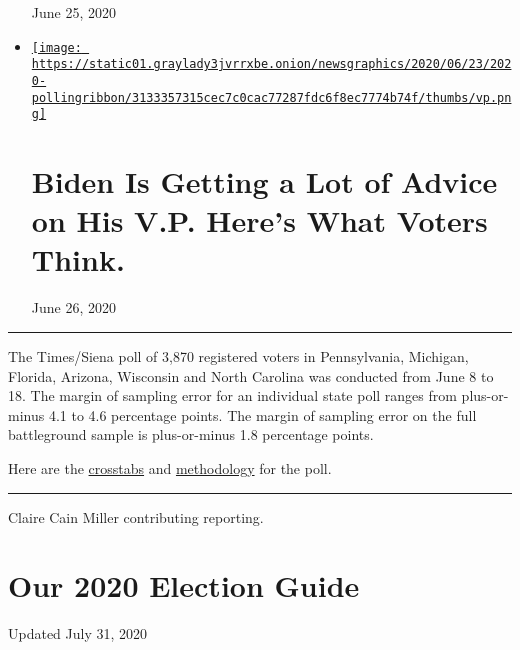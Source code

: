 \begin{itemize}
  June 25, 2020
\item
  \href{https://www.nytimes3xbfgragh.onion/2020/06/26/us/politics/biden-vice-president-voters.html}{\texttt{[image: https://static01.graylady3jvrrxbe.onion/newsgraphics/2020/06/23/2020-pollingribbon/3133357315cec7c0cac77287fdc6f8ec7774b74f/thumbs/vp.png]}}

  \href{https://www.nytimes3xbfgragh.onion/2020/06/26/us/politics/biden-vice-president-voters.html}{}

  \hypertarget{biden-is-getting-a-lot-of-advice-on-his-vp-heres-what-voters-think}{%
  \section{Biden Is Getting a Lot of Advice on His V.P. Here's What
  Voters
  Think.}\label{biden-is-getting-a-lot-of-advice-on-his-vp-heres-what-voters-think}}

  June 26, 2020
\end{itemize}

\begin{center}\rule{0.5\linewidth}{\linethickness}\end{center}

The Times/Siena poll of 3,870 registered voters in Pennsylvania,
Michigan, Florida, Arizona, Wisconsin and North Carolina was conducted
from June 8 to 18. The margin of sampling error for an individual state
poll ranges from plus-or-minus 4.1 to 4.6 percentage points. The margin
of sampling error on the full battleground sample is plus-or-minus 1.8
percentage points.

Here are the
\href{https://int.graylady3jvrrxbe.onion/data/documenttools/battleground-0625/6ca076db1919b722/full.pdf}{crosstabs}
and
\href{https://int.graylady3jvrrxbe.onion/data/documenttools/nyt-siena-poll-methodology-june-2020/f6f533b4d07f4cbe/full.pdf}{methodology}
for the poll.

\begin{center}\rule{0.5\linewidth}{\linethickness}\end{center}

Claire Cain Miller contributing reporting.

\hypertarget{our-2020-election-guide}{%
\section{Our 2020 Election Guide}\label{our-2020-election-guide}}

Updated July 31, 2020

